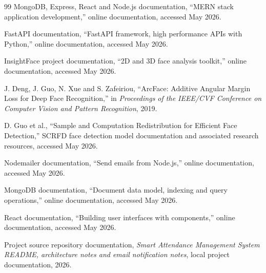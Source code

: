 \documentclass[12pt,a4paper,oneside]{report}
\begin{document}









\appendix


\begin{thebibliography}{99}
MongoDB, Express, React and Node.js documentation, ``MERN stack application development,'' online documentation, accessed May 2026.

FastAPI documentation, ``FastAPI framework, high performance APIs with Python,'' online documentation, accessed May 2026.

InsightFace project documentation, ``2D and 3D face analysis toolkit,'' online documentation, accessed May 2026.

J. Deng, J. Guo, N. Xue and S. Zafeiriou, ``ArcFace: Additive Angular Margin Loss for Deep Face Recognition,'' in \textit{Proceedings of the IEEE/CVF Conference on Computer Vision and Pattern Recognition}, 2019.

D. Guo et al., ``Sample and Computation Redistribution for Efficient Face Detection,'' SCRFD face detection model documentation and associated research resources, accessed May 2026.

Nodemailer documentation, ``Send emails from Node.js,'' online documentation, accessed May 2026.

MongoDB documentation, ``Document data model, indexing and query operations,'' online documentation, accessed May 2026.

React documentation, ``Building user interfaces with components,'' online documentation, accessed May 2026.

Project source repository documentation, \textit{Smart Attendance Management System README, architecture notes and email notification notes}, local project documentation, 2026.
\end{thebibliography}
\end{document}

